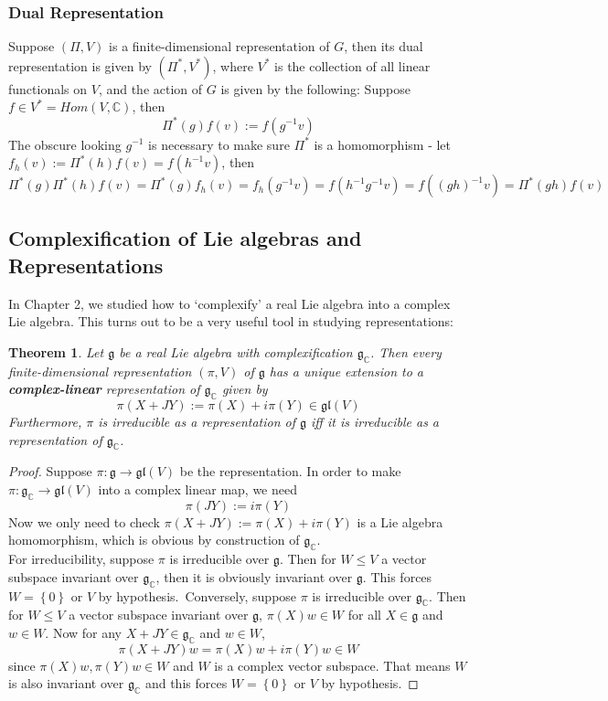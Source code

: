 \documentclass[11pt]{article}
\newtheorem{theorem}{Theorem}[section]
\newcommand{\bb}[1]{\mathbb{#1}}
\newcommand{\mf}[1]{\mathfrak{#1}}
\begin{document}
\subsubsection{Dual Representation}
Suppose $(\Pi,V)$ is a finite-dimensional representation of $G$, then its dual representation is given by $(\Pi^*, V^*)$, where $V^*$ is the collection of all linear functionals on $V$, and the action of $G$ is given by the following: Suppose $f \in V^* = Hom(V,\bb{C})$, then
$$\Pi^*(g)f(v) := f(g^{-1}v)$$
The obscure looking $g^{-1}$ is necessary to make sure $\Pi^*$ is a homomorphism - let $f_h(v) := \Pi^*(h)f(v) = f(h^{-1}v)$, then
$$\Pi^*(g)\Pi^*(h)f(v) = \Pi^*(g)f_h(v) = f_h(g^{-1}v) = f(h^{-1}g^{-1}v) = f((gh)^{-1}v) = \Pi^*(gh)f(v)$$


\subsection{Complexification of Lie algebras and Representations} \label{complex}
In Chapter 2, we studied how to `complexify' a real Lie algebra into a complex Lie algebra. This turns out to be a very useful tool in studying representations:
\begin{theorem}
Let $\mf{g}$ be a real Lie algebra with complexification $\mf{g}_{\bb{C}}$. Then every finite-dimensional representation $(\pi,V)$ of $\mf{g}$ has a unique extension to a \textbf{complex-linear} representation of $\mf{g}_{\bb{C}}$ given by
$$\pi(X + JY) := \pi(X) + i\pi(Y) \in \mf{gl}(V)$$
Furthermore, $\pi$ is irreducible as a representation of $\mf{g}$ iff it is irreducible as a representation of $\mf{g}_{\bb{C}}$.
\end{theorem}
\begin{proof}
Suppose $\pi: \mf{g} \to \mf{gl}(V)$ be the representation. In order to make $\pi: \mf{g}_{\bb{C}} \to \mf{gl}(V)$ into a complex linear map, we need
$$\pi(JY) := i\pi(Y)$$
Now we only need to check $\pi(X+JY) := \pi(X) + i\pi(Y)$ is a Lie algebra homomorphism, which is obvious by construction of $\mf{g}_{\bb{C}}$.\\
For irreducibility, suppose $\pi$ is irreducible over $\mf{g}$. Then for $W \leq V$ a vector subspace invariant over $\mf{g}_{\bb{C}}$, then it is obviously invariant over $\mf{g}$. This forces $W = \left\{0\right\}$ or $V$ by hypothesis.\
Conversely, suppose $\pi$ is irreducible over $\mf{g}_{\bb{C}}$. Then for $W \leq V$ a vector subspace invariant over $\mf{g}$, $\pi(X)w \in W$ for all $X \in \mf{g}$ and $w \in W$. Now for any $X+ JY \in \mf{g}_{\bb{C}}$ and $w \in W$,
$$\pi(X+JY)w = \pi(X)w + i\pi(Y)w \in W$$
since $\pi(X)w, \pi(Y)w \in W$ and $W$ is a complex vector subspace. That means $W$ is also invariant over $\mf{g}_{\bb{C}}$ and this forces $W = \left\{0\right\}$ or $V$ by hypothesis.
\end{proof}
\end{document}
